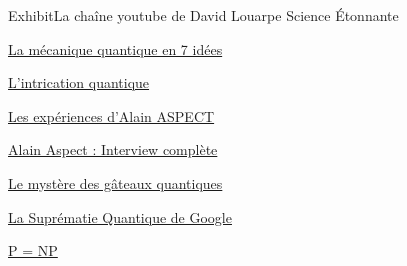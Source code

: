 \documentclass{beamer}
\begin{document}
\begin{frame}{Exhibit}{La cha\^ine youtube de David Louarpe Science \'Etonnante}
  \begin{description}
  \item \href{https://www.youtube.com/watch?v=Rj3jTw2DxXQ&t=3s}{La mécanique quantique en 7 idées}
  \item \href{https://www.youtube.com/watch?v=5R6k2mEacZo&t=8s}{L'intrication quantique}
  \item \href{https://www.youtube.com/watch?v=hB1kmGzpIrw}{Les expériences d'Alain ASPECT}
  \item \href{https://www.youtube.com/watch?v=OeZ_63iKPho&t=556s}{Alain Aspect : Interview complète}
  \item \href{https://www.youtube.com/watch?v=hB1kmGzpIrw}{Le mystère des gâteaux quantiques}
  \item \href{https://www.youtube.com/watch?v=KaRd_eB2qOA}{La Suprématie Quantique de Google}
  \item \href{https://www.youtube.com/watch?v=AgtOCNCejQ8}{P = NP}
  \end{description}
\end{frame}
\end{document}

